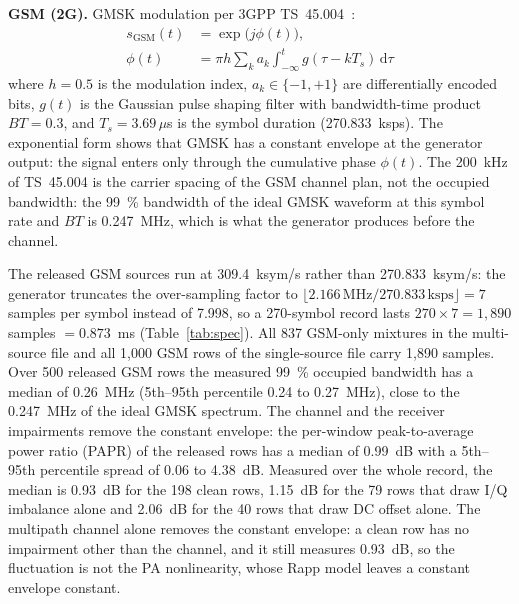 \documentclass[journal]{IEEEtran}
\begin{document}
\textbf{GSM (2G).} GMSK modulation per 3GPP TS~45.004~\cite{3gpp45004}:
\begin{equation}
\begin{split}
s_{\text{GSM}}(t) &= \exp\!\bigl(j\phi(t)\bigr), \\
\phi(t) &= \pi h \sum_k a_k \int_{-\infty}^{t} g(\tau - kT_s)\,\mathrm{d}\tau
\end{split}
\label{eq:gsm}
\end{equation}
where $h\!=\!0.5$ is the modulation index, $a_k \in \{-1,+1\}$ are
differentially encoded bits, $g(t)$ is the Gaussian pulse shaping filter with
bandwidth-time product $BT\!=\!0.3$, and $T_s\!=\!3.69\,\mu$s is the symbol
duration (270.833~ksps). The exponential form shows that GMSK has a constant
envelope at the generator output: the signal enters only through the cumulative
phase $\phi(t)$. The 200~kHz of TS~45.004 is the carrier spacing of the GSM
channel plan, not the occupied bandwidth: the 99~\% bandwidth of the ideal GMSK
waveform at this symbol rate and $BT$ is 0.247~MHz, which is what the generator
produces before the channel.

The released GSM sources run at 309.4~ksym/s rather than 270.833~ksym/s: the
generator truncates the over-sampling factor to
$\lfloor 2.166\,\text{MHz}/270.833\,\text{ksps}\rfloor = 7$ samples per symbol
instead of 7.998, so a 270-symbol record lasts $270\times7 = 1{,}890$ samples
$= 0.873$~ms (Table~\ref{tab:spec}). All 837 GSM-only mixtures in the multi-source
file and all 1,000 GSM rows of the single-source file carry 1,890 samples. Over
500 released GSM rows the measured
99~\% occupied bandwidth has a median of 0.26~MHz (5th--95th percentile 0.24 to
0.27~MHz), close to the 0.247~MHz of the ideal GMSK spectrum. The channel and the
receiver impairments remove the constant envelope: the per-window
peak-to-average power ratio (PAPR) of the released rows has a median of 0.99~dB
with a 5th--95th percentile spread of 0.06 to 4.38~dB. Measured over the whole
record, the median is 0.93~dB for the 198 clean rows, 1.15~dB for the 79 rows
that draw I/Q imbalance alone and 2.06~dB for the 40 rows that draw DC offset
alone. The multipath channel alone removes the constant envelope: a clean row has
no impairment other than the channel, and it still measures 0.93~dB, so the
fluctuation is not the PA nonlinearity, whose Rapp model leaves a constant
envelope constant.
\end{document}

